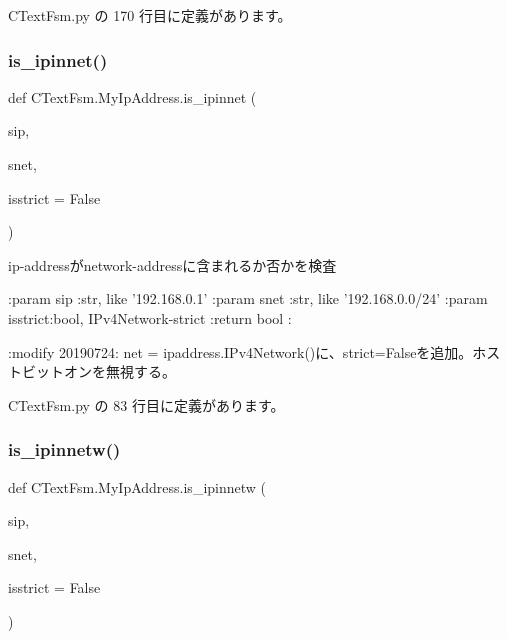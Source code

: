  C\+Text\+Fsm.\+py の 170 行目に定義があります。

\mbox{\label{classCTextFsm_1_1MyIpAddress_a70adbc4f3faf89e98425a1799c13b231}} 
\subsubsection{\texorpdfstring{is\_ipinnet()}{is\_ipinnet()}}
{\footnotesize\ttfamily def C\+Text\+Fsm.\+My\+Ip\+Address.\+is\+\_\+ipinnet (\begin{DoxyParamCaption}\item[{}]{sip,  }\item[{}]{snet,  }\item[{}]{isstrict = {\ttfamily False} }\end{DoxyParamCaption})\hspace{0.3cm}{\ttfamily [static]}}

\begin{DoxyVerb}ip-addressがnetwork-addressに含まれるか否かを検査

:param  sip  :str, like '192.168.0.1'
:param  snet :str, like '192.168.0.0/24'
:param  isstrict:bool, IPv4Network-strict
:return bool :

:modify 20190724:
  net = ipaddress.IPv4Network()に、strict=Falseを追加。ホストビットオンを無視する。
\end{DoxyVerb}
 

 C\+Text\+Fsm.\+py の 83 行目に定義があります。

\mbox{\label{classCTextFsm_1_1MyIpAddress_ac1dbadf1089b19f5c735e8b76e66dbc0}} 
\subsubsection{\texorpdfstring{is\_ipinnetw()}{is\_ipinnetw()}}
{\footnotesize\ttfamily def C\+Text\+Fsm.\+My\+Ip\+Address.\+is\+\_\+ipinnetw (\begin{DoxyParamCaption}\item[{}]{sip,  }\item[{}]{snet,  }\item[{}]{isstrict = {\ttfamily False} }\end{DoxyParamCaption})\hspace{0.3cm}{\ttfamily [static]}}

